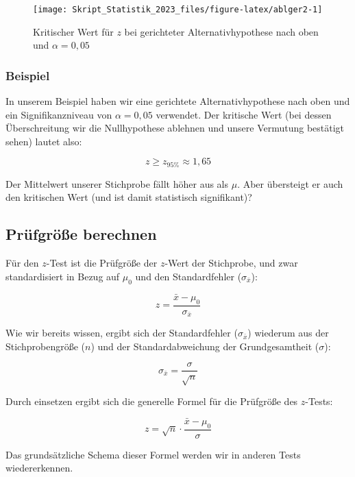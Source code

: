 \documentclass[
  11pt,
  ngerman,
  a4paper,
]{report}
\begin{document}
\begin{figure}[!h]

{\centering \texttt{[image: Skript\_Statistik\_2023\_files/figure-latex/ablger2-1]} 

}

\caption{Kritischer Wert für $z$ bei gerichteter Alternativhypothese nach oben und $\alpha=0{,}05$}\label{fig:ablger2}
\end{figure}

\hypertarget{beispiel-3}{%
\subsubsection{Beispiel}\label{beispiel-3}}

In unserem Beispiel haben wir eine gerichtete Alternativhypothese nach oben und ein Signifikanzniveau von \(\alpha=0{,}05\) verwendet. Der kritische Wert (bei dessen Überschreitung wir die Nullhypothese ablehnen und unsere Vermutung bestätigt sehen) lautet also:

\[
z \geq z_{95\%}\approx 1{,}65
\]

Der Mittelwert unserer Stichprobe fällt höher aus als \(\mu\). Aber übersteigt er auch den kritischen Wert (und ist damit statistisch signifikant)?

\hypertarget{pruxfcfgruxf6uxdfe-berechnen}{%
\subsection{Prüfgröße berechnen}\label{pruxfcfgruxf6uxdfe-berechnen}}

Für den \(z\)-Test ist die Prüfgröße der \(z\)-Wert der Stichprobe, und zwar standardisiert in Bezug auf \(\mu_0\) und den Standardfehler (\(\sigma_{\bar{x}}\)):

\[
z=\frac{\bar{x}-\mu_0}{\sigma_{\bar{x}}}
\label{eq:trans}
\]

Wie wir bereits wissen, ergibt sich der Standardfehler (\(\sigma_{\bar{x}}\)) wiederum aus der Stichprobengröße (\(n\)) und der Standardabweichung der Grundgesamtheit (\(\sigma\)):

\[
\sigma_{\bar{x}}=\frac{\sigma}{\sqrt{n}}
\label{eq:serr}
\]

Durch einsetzen ergibt sich die generelle Formel für die Prüfgröße des \(z\)-Tests:

\[
z=\sqrt{n}\cdot\frac{\bar{x}-\mu_0}{\sigma}
\label{eq:5z}
\]

Das grundsätzliche Schema dieser Formel werden wir in anderen Tests wiedererkennen.
\end{document}
